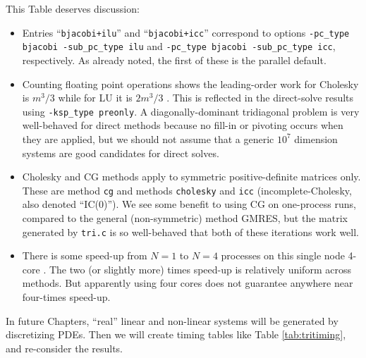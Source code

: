 This Table deserves discussion:
\begin{itemize}
\item Entries ``\texttt{bjacobi+ilu}'' and ``\texttt{bjacobi+icc}'' correspond to options \texttt{-pc\_type bjacobi -sub\_pc\_type ilu} and \texttt{-pc\_type bjacobi -sub\_pc\_type icc}, respectively.  As already noted, the first of these is the parallel default.
\item Counting floating point operations shows the leading-order work for Cholesky is $m^3/3$ while for LU it is $2 m^3/3$ \citep{TrefethenBau1997}.  This is reflected in the direct-solve results using \texttt{-ksp\_type preonly}.  A diagonally-dominant tridiagonal problem is very well-behaved for direct methods because no fill-in or pivoting occurs when they are applied, but we should not assume that a generic $10^7$ dimension systems are good candidates for direct solves.
\item Cholesky and CG methods apply to symmetric positive-definite matrices only.  These are \pKSP method \texttt{cg} and \pPC methods \texttt{cholesky} and \texttt{icc} (incomplete-Cholesky, also denoted ``IC($0$)'').  We see some benefit to using CG on one-process runs, compared to the general (non-symmetric) method GMRES, but the matrix generated by \texttt{tri.c} is so well-behaved that both of these iterations work well.
\item There is some speed-up from $N=1$ to $N=4$ processes on this single node 4-core \WORKSTATION.  The two (or slightly more) times speed-up is relatively uniform across methods.  But apparently using four cores does not guarantee anywhere near four-times speed-up.
\end{itemize}

In future Chapters, ``real'' linear and non-linear systems will be generated by discretizing PDEs.  Then we will create timing tables like Table \ref{tab:tritiming}, and re-consider the results.

